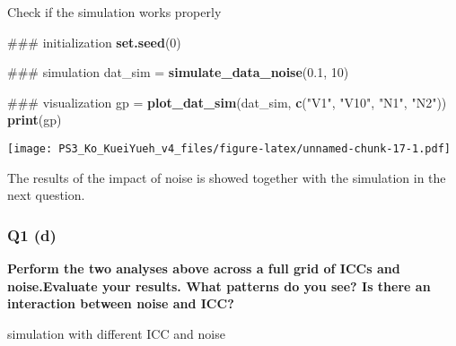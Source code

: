 \documentclass[]{article}
\newenvironment{Shaded}{\begin{snugshade}}{\end{snugshade}}
\newcommand{\KeywordTok}[1]{\textcolor[rgb]{0.13,0.29,0.53}{\textbf{#1}}}
\newcommand{\DecValTok}[1]{\textcolor[rgb]{0.00,0.00,0.81}{#1}}
\newcommand{\FloatTok}[1]{\textcolor[rgb]{0.00,0.00,0.81}{#1}}
\newcommand{\StringTok}[1]{\textcolor[rgb]{0.31,0.60,0.02}{#1}}
\newcommand{\NormalTok}[1]{#1}
\begin{document}
Check if the simulation works properly

\begin{Shaded}
\begin{Highlighting}[]
\NormalTok{### initialization}
\KeywordTok{set.seed}\NormalTok{(}\DecValTok{0}\NormalTok{)}

\NormalTok{### simulation}
\NormalTok{dat_sim =}\StringTok{ }\KeywordTok{simulate_data_noise}\NormalTok{(}\FloatTok{0.1}\NormalTok{, }\DecValTok{10}\NormalTok{)}

\NormalTok{### visualization}
\NormalTok{gp =}\StringTok{ }\KeywordTok{plot_dat_sim}\NormalTok{(dat_sim, }\KeywordTok{c}\NormalTok{(}\StringTok{"V1"}\NormalTok{, }\StringTok{"V10"}\NormalTok{, }\StringTok{"N1"}\NormalTok{, }\StringTok{"N2"}\NormalTok{))}
\KeywordTok{print}\NormalTok{(gp)}
\end{Highlighting}
\end{Shaded}

\texttt{[image: PS3\_Ko\_KueiYueh\_v4\_files/figure-latex/unnamed-chunk-17-1.pdf]}

The results of the impact of noise is showed together with the
simulation in the next question.

\subsubsection{Q1 (d)}\label{q1-d}

\textbf{Perform the two analyses above across a full grid of ICCs and
noise.Evaluate your results. What patterns do you see? Is there an
interaction between noise and ICC?}

simulation with different ICC and noise
\end{document}
